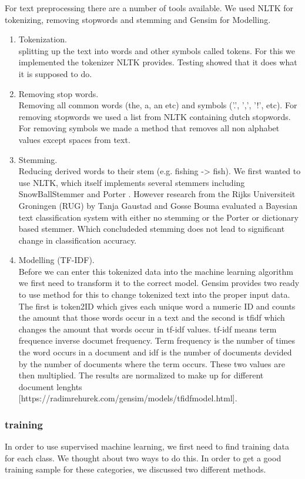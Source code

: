 For text preprocessing there are a number of tools available. We used NLTK \cite{nlkt_stemming} for tokenizing, removing stopwords and stemming and Gensim \cite{Gensim} for Modelling.
\begin{enumerate}
\item Tokenization. \\ splitting up the text into words and other symbols called tokens. For this we implemented the tokenizer NLTK provides. Testing showed that it does what it is supposed to do.
\item Removing stop words. \\ Removing all common words (the, a, an etc) and symbols ('.', ',', '!', etc). For removing stopwords we used a list from NLTK containing dutch stopwords. For removing symbols we made a method that removes all non alphabet values except spaces from text. 
\item Stemming. \\ Reducing derived words to their stem (e.g. fishing -> fish). We first wanted to use NLTK, which itself implements several stemmers including SnowBallStemmer \cite{snowball_dutch} and Porter \cite{porter_Stemmer}. However research from the Rijks Universiteit Groningen (RUG) by Tanja Gaustad and Gosse Bouma \cite{gaustad2002accurate} evaluated a Bayesian text classification system with either no stemming or the Porter or dictionary based stemmer. Which concludeded stemming does not lead to significant change in classification accuracy.

\item Modelling (TF-IDF). \\ Before we can enter this tokenized data into the machine learning algorithm we first need to transform it to the correct model. Gensim provides two ready to use method for this to change tokenized text into the proper input data. The first is token2ID which gives each unique word a numeric ID and counts the amount that those words occur in a text and the second is tfidf which changes the amount that words occur in tf-idf values. tf-idf means term frequence inverse documet frequency. Term frequency is the number of times the word occurs in a document and idf is the number of documents devided by the number of documents where the term occurs. These two values are then multiplied. The results are normalized to make up for different document lenghts [https://radimrehurek.com/gensim/models/tfidfmodel.html].
\end{enumerate}

\subsubsection{training}
In order to use supervised machine learning, we first need to find training data for each class. We thought about two ways to do this. In order to get a good training sample for these categories, we discussed two different methods. \\

